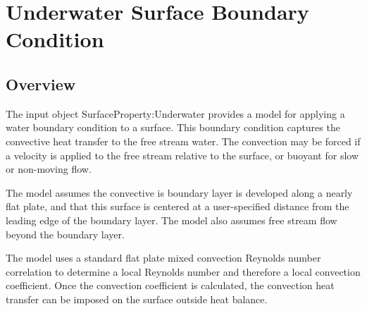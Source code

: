 \section{Underwater Surface Boundary Condition}\label{otherside-conditions-model-underwater}

\subsection{Overview}\label{overview-201709281617}

The input object SurfaceProperty:Underwater provides a model for applying a water boundary condition to a surface.
This boundary condition captures the convective heat transfer to the free stream water.
The convection may be forced if a velocity is applied to the free stream relative to the surface, or buoyant for slow or non-moving flow.

The model assumes the convective is boundary layer is developed along a nearly flat plate, and that this surface is centered at a user-specified distance from the leading edge of the boundary layer.
The model also assumes free stream flow beyond the boundary layer.

The model uses a standard flat plate mixed convection Reynolds number correlation to determine a local Reynolds number and therefore a local convection coefficient.
Once the convection coefficient is calculated, the convection heat transfer can be imposed on the surface outside heat balance.
